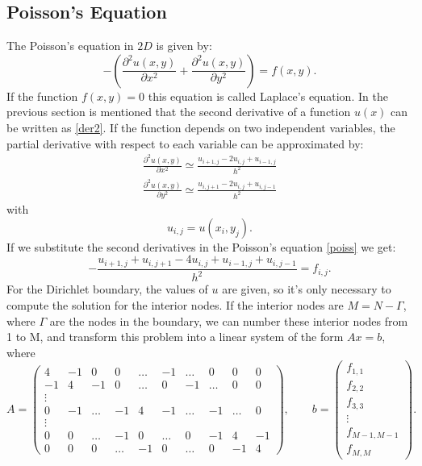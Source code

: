 \documentclass[a4paper,10pt]{report}
\begin{document}
\subsection{Poisson's Equation}
The Poisson's equation in $2D$ is given by:
\begin{equation}
 -\left(\frac{\partial^2 u(x,y)}{\partial x^2}+\frac{\partial^2 u(x,y)}{\partial y^2}\right)=f(x,y). \label{poiss}
\end{equation}
If the function $f(x,y)=0$ this equation is called Laplace's equation.
In the previous section is mentioned that the second derivative of a function $u(x)$ can be written as \eqref{der2}. If the function
depends on two independent variables, the partial derivative with respect to each variable can be approximated by:
\begin{gather*}
\frac{\partial^2 u(x,y)}{\partial x^2}\simeq \frac{u_{i+1,j}-2u_{i,j}+u_{i-1,j}}{h^2}\\
 \frac{\partial^2 u(x,y)}{\partial y^2}\simeq \frac{u_{i,j+1}-2u_{i,j}+u_{i,j-1}}{h^2}
\end{gather*}
with $$u_{i,j}=u(x_i,y_j).$$
If we substitute the second derivatives in the Poisson's equation \eqref{poiss} we get:
\begin{equation*}
-\frac{u_{i+1,j}+u_{i,j+1}-4u_{i,j}+u_{i-1,j}+u_{i,j-1}}{h^2}=f_{i,j}.
\end{equation*}
For the Dirichlet boundary, the values of $u$ are given, so it's only necessary to compute the solution for the interior nodes.
If the interior nodes are $M=N-\Gamma$, where $\Gamma$ are the nodes in the boundary, we can 
number these interior nodes
from 1 to M, and transform this problem into a linear system of the form $Ax=b$, where
\begin{equation*}
A=
\begin{pmatrix}
4 & -1 & 0  & 0 &\dots &-1 &\dots  & 0 &0 &0\\
-1 &4 & -1 & 0  &\dots & 0 &-1 & \dots  & 0 &0 \\
\vdots\\
0  &-1 &\dots &  -1 &4 & -1   &\dots &-1 & \dots  & 0 \\
                    \vdots \\
0 & 0  &\dots &-1 & 0  & \dots  &0 &-1 & 4 &-1\\
0 & 0 & 0 &\dots &-1& 0  &\dots &0 &-1 & 4
\end{pmatrix}, \qquad
b=
\begin{pmatrix}
f_{1,1}\\
f_{2,2}\\
f_{3,3}\\
\vdots\\
f_{M-1,M-1}\\
f_{M,M}
\end{pmatrix}.
\end{equation*}
\end{document}
